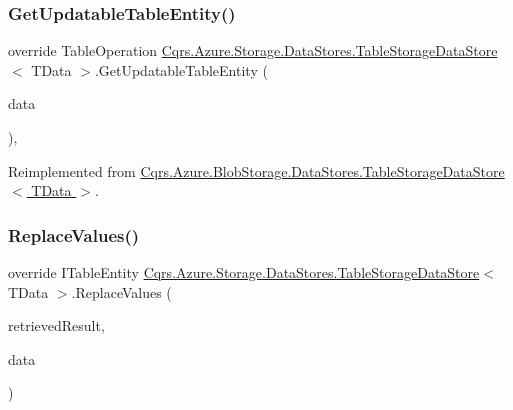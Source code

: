 \subsubsection{\texorpdfstring{Get\+Updatable\+Table\+Entity()}{GetUpdatableTableEntity()}}
{\footnotesize\ttfamily override Table\+Operation \hyperlink{classCqrs_1_1Azure_1_1Storage_1_1DataStores_1_1TableStorageDataStore}{Cqrs.\+Azure.\+Storage.\+Data\+Stores.\+Table\+Storage\+Data\+Store}$<$ T\+Data $>$.Get\+Updatable\+Table\+Entity (\begin{DoxyParamCaption}\item[{T\+Data}]{data }\end{DoxyParamCaption})\hspace{0.3cm}{\ttfamily [protected]}, {\ttfamily [virtual]}}



Reimplemented from \hyperlink{classCqrs_1_1Azure_1_1BlobStorage_1_1DataStores_1_1TableStorageDataStore_aa4dc1bfeeb55483b68d8af3414000f7a_aa4dc1bfeeb55483b68d8af3414000f7a}{Cqrs.\+Azure.\+Blob\+Storage.\+Data\+Stores.\+Table\+Storage\+Data\+Store$<$ T\+Data $>$}.

\mbox{\label{classCqrs_1_1Azure_1_1Storage_1_1DataStores_1_1TableStorageDataStore_ae9aeb3daf2648a03db25f2a3ddfd87ee_ae9aeb3daf2648a03db25f2a3ddfd87ee}} 
\subsubsection{\texorpdfstring{Replace\+Values()}{ReplaceValues()}}
{\footnotesize\ttfamily override I\+Table\+Entity \hyperlink{classCqrs_1_1Azure_1_1Storage_1_1DataStores_1_1TableStorageDataStore}{Cqrs.\+Azure.\+Storage.\+Data\+Stores.\+Table\+Storage\+Data\+Store}$<$ T\+Data $>$.Replace\+Values (\begin{DoxyParamCaption}\item[{Table\+Result}]{retrieved\+Result,  }\item[{\hyperlink{classCqrs_1_1Azure_1_1BlobStorage_1_1EntityTableEntity}{Entity\+Table\+Entity}$<$ T\+Data $>$}]{data }\end{DoxyParamCaption})\hspace{0.3cm}{\ttfamily [protected]}}

